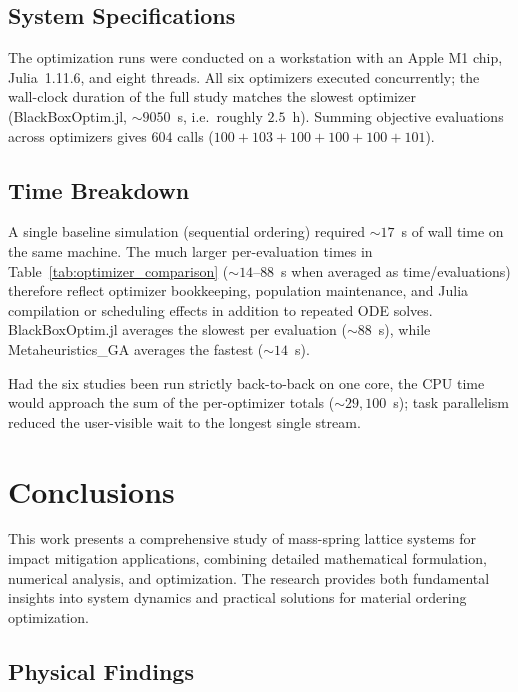 \documentclass[11pt,a4paper]{article}
\begin{document}
\subsection{System Specifications}

\noindent The optimization runs were conducted on a workstation with an Apple M1 chip, Julia~1.11.6, and eight threads. All six optimizers executed concurrently; the wall-clock duration of the full study matches the slowest optimizer (BlackBoxOptim.jl, $\sim 9050$~s, i.e.\ roughly $2.5$~h). Summing objective evaluations across optimizers gives $604$ calls ($100{+}103{+}100{+}100{+}100{+}101$). \newline

\subsection{Time Breakdown}

\noindent A single baseline simulation (sequential ordering) required $\sim 17$~s of wall time on the same machine. The much larger per-evaluation times in Table~\ref{tab:optimizer_comparison} ($\sim 14$--$88$~s when averaged as time/evaluations) therefore reflect optimizer bookkeeping, population maintenance, and Julia compilation or scheduling effects in addition to repeated ODE solves. BlackBoxOptim.jl averages the slowest per evaluation ($\sim 88$~s), while Metaheuristics\_GA averages the fastest ($\sim 14$~s). \newline

\noindent Had the six studies been run strictly back-to-back on one core, the CPU time would approach the sum of the per-optimizer totals ($\sim 29{,}100$~s); task parallelism reduced the user-visible wait to the longest single stream. \newline

\section{Conclusions}
\label{sec:conclusions}

\noindent This work presents a comprehensive study of mass-spring lattice systems for impact mitigation applications, combining detailed mathematical formulation, numerical analysis, and optimization. The research provides both fundamental insights into system dynamics and practical solutions for material ordering optimization.

\subsection{Physical Findings}
\end{document}
